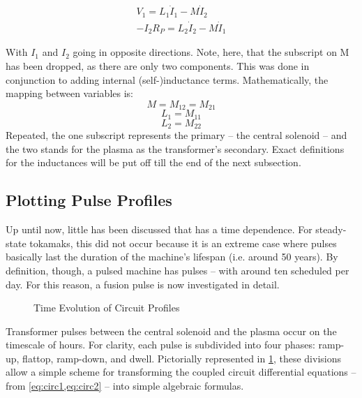 \begin{align}
	\label{eq:circ1}
	V_1 = L_1 \dot I_1 - M \dot I_2 \\
	\label{eq:circ2}
	-I_2 R_P = L_2 \dot I_2 - M \dot I_1
\end{align}

With $I_1$ and $I_2$ going in opposite directions. Note, here, that the subscript on M has been dropped, as there are only two components. This was done in conjunction to adding internal (self-)inductance terms. Mathematically, the mapping between variables is:
\begin{equation}
	M = M_{12} = M_{21}
\end{equation}
\begin{equation}
	L_1 = M_{11}
\end{equation}
\begin{equation}
	L_2 = M_{22}
\end{equation}
Repeated, the one subscript represents the primary -- the central solenoid -- and the two stands for the plasma as the transformer's secondary. Exact definitions for the inductances will be put off till the end of the next subsection.

\subsection{Plotting Pulse Profiles}

Up until now, little has been discussed that has a time dependence. For steady-state tokamaks, this did not occur because it is an extreme case where pulses basically last the duration of the machine's lifespan (i.e. around 50 years). By definition, though, a pulsed machine has pulses -- with around ten scheduled per day. For this reason, a fusion pulse is now investigated in detail.

\begin{figure}[h!]
\centering

\caption{Time Evolution of Circuit Profiles}
\label{fig:circuit_profiles}
\end{figure}

Transformer pulses between the central solenoid and the plasma occur on the timescale of hours.  For clarity, each pulse is subdivided into four phases: ramp-up, flattop, ramp-down, and dwell. Pictorially represented in \cref{fig:circuit_profiles}, these divisions allow a simple scheme for transforming the coupled circuit differential equations -- from \cref{eq:circ1,eq:circ2} -- into simple algebraic formulas. 

